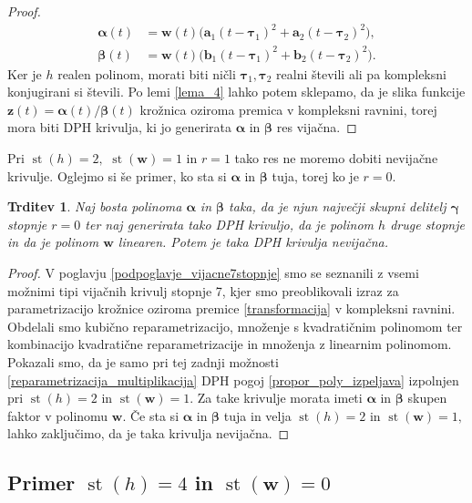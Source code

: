 \documentclass[12pt,a4paper,twoside]{article}
\theoremstyle{definition} %
\theoremstyle{plain} %
\newtheorem{trditev}[definicija]{Trditev}
\theoremstyle{primerstyle}
\numberwithin{equation}{section}  %
\newcommand{\aV}{\mathbf{a}}
\newcommand{\bV}{\mathbf{b}}
\newcommand{\wV}{\mathbf{w}}
\newcommand{\zV}{\mathbf{z}}
\newcommand{\balpha}{\boldsymbol \alpha}
\newcommand{\bbeta}{\boldsymbol \beta}
\newcommand{\bgamma}{\boldsymbol \gamma}
\newcommand{\btau}{\boldsymbol \tau}
\DeclareMathOperator{\st}{st}
\begin{document}
\begin{proof}
	\begin{align*}
		\balpha(t)&=\wV(t)\big(\aV_1(t-\btau_1)^2+\aV_2(t-\btau_2)^2\big),\\
		\bbeta(t)&=\wV(t)\big(\bV_1(t-\btau_1)^2+\bV_2(t-\btau_2)^2\big).
	\end{align*}
	Ker je $h$ realen polinom, morati biti ničli $\btau_1,\btau_2$ realni števili ali pa kompleksni konjugirani si števili. Po lemi \ref{lema_4} lahko potem sklepamo, da je slika funkcije $\zV(t)=\balpha(t)/\bbeta(t)$ krožnica oziroma premica v kompleksni ravnini, torej mora biti DPH krivulja, ki jo generirata $\balpha$ in $\bbeta$ res vijačna.
\end{proof}
Pri $\st(h)=2,$ $\st(\wV)=1$ in $r=1$ tako res ne moremo dobiti nevijačne krivulje. Oglejmo si še primer, ko sta si $\balpha$ in $\bbeta$ tuja, torej ko je $r=0.$
\begin{trditev}
	\label{locevanje_h2w1_trditev2}
	Naj bosta polinoma $\balpha$ in $\bbeta$ taka, da je njun največji skupni delitelj $\bgamma$ stopnje $r=0$ ter naj generirata tako DPH krivuljo, da je polinom $h$ druge stopnje in da je polinom $\wV$ linearen. Potem je taka DPH krivulja nevijačna.
\end{trditev}
\begin{proof}
	V poglavju \ref{podpoglavje_vijacne7stopnje} smo se seznanili z vsemi možnimi tipi vijačnih krivulj stopnje 7, kjer smo preoblikovali izraz za parametrizacijo krožnice oziroma premice \eqref{transformacija} v kompleksni ravnini. Obdelali smo kubično reparametrizacijo, množenje s kvadratičnim polinomom ter kombinacijo kvadratične reparametrizacije in množenja z linearnim polinomom. Pokazali smo, da je samo pri tej zadnji možnosti \ref{reparametrizacija_multiplikacija} DPH pogoj \eqref{propor_poly_izpeljava} izpolnjen pri $\st(h)=2$ in $\st(\wV)=1.$ Za take krivulje morata imeti $\balpha$ in $\bbeta$ skupen faktor v polinomu $\wV.$ Če sta si $\balpha$ in $\bbeta$ tuja in velja $\st(h)=2$ in $\st(\wV)=1,$ lahko zaključimo, da je taka krivulja nevijačna.
\end{proof}

\subsection{Primer \texorpdfstring{$\st(h)=4$}{st(h)=4} in \texorpdfstring{$\st(\wV)=0$}{st(w)=0}}
\label{locevanje_h4w0}
\end{document}
